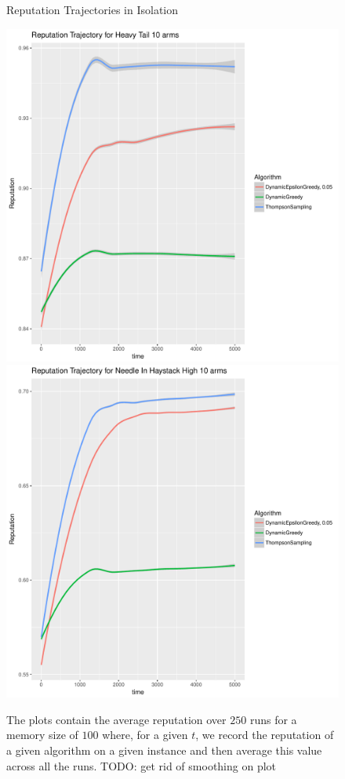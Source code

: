 \documentclass{article}
\theoremstyle{definition}
\begin{document}
\begin{figure}
\caption{Reputation Trajectories in Isolation}
\includegraphics[scale=0.2]{"figures/Reputation Trajectory for Heavy Tail 10 arms"}
\includegraphics[scale=0.2]{"figures/Reputation Trajectory for Needle In Haystack High 10 arms"}
\label{prelim_means}
\caption*{\tiny{The plots contain the average reputation over $250$ runs for a memory size of $100$ where, for a given $t$, we record the reputation of a given algorithm on a given instance and then average this value across all the runs. TODO: get rid of smoothing on plot}}
\end{figure}
\end{document}

